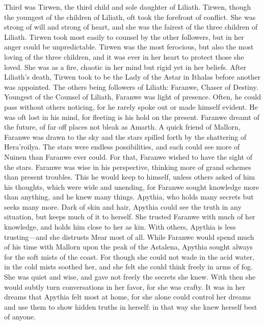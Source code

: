 \documentclass[smalldemyvopaper,11pt,twoside,onecolumn,openright,extrafontsizes]{memoir}
\begin{document}
{{Third was Tirwen, the third child and sole daughter of Liliath. Tirwen, though the youngest of the children of Liliath, oft took the forefront of conflict. She was strong of will and strong of heart, and she was the fairest of the three children of Liliath. Tirwen took most easily to counsel by the other followers, but in her anger could be unpredictable. Tirwen was the most ferocious, but also the most loving of the three children, and it was ever in her heart to protect those she loved. She was as a fire, chaotic in her mind but rigid yet in her beliefs. After Liliath’s death, Tirwen took to be the Lady of the Astar in Ithalas before another was appointed.
The others being followers of Liliath:
Faranwe, Chaser of Destiny. Youngest of the Counsel of Liliath, Faranwe was light of presence. Often, he could pass without others noticing, for he rarely spoke out or made himself evident. He was oft lost in his mind, for fleeting is his hold on the present. Faranwe dreamt of the future, of far off places not bleak as Amarth. A quick friend of Mallorn, Faranwe was drawn to the sky and the stars spilled forth by the shattering of Hera’roilya. The stars were endless possibilities, and each could see more of Nuinen than Faranwe ever could. For that, Faranwe wished to have the sight of the stars. Faranwe was wise in his perspective, thinking more of grand schemes than present troubles. This he would keep to himself, unless others asked of him his thoughts, which were wide and unending, for Faranwe sought knowledge more than anything, and he knew many things.
Apythia, who holds many secrets but seeks many more. Dark of skin and hair, Apythia could see the truth in any situation, but keeps much of it to herself. She trusted Faranwe with much of her knowledge, and holds him close to her as kin. With others, Apythia is less trusting—and she distrusts Mear most of all. While Faranwe would spend much of his time with Mallorn upon the peak of the Astalena, Apythia sought always for the soft mists of the coast. For though she could not wade in the acid water, in the cold mists soothed her, and she felt she could think freely in arms of fog. She was quiet and wise, and gave not freely the secrets she knew. With then she would subtly turn conversations in her favor, for she was crafty. It was in her dreams that Apythia felt most at home, for she alone could control her dreams and use them to show hidden truths in herself: in that way she knew herself best of anyone.
}}
\end{document}
